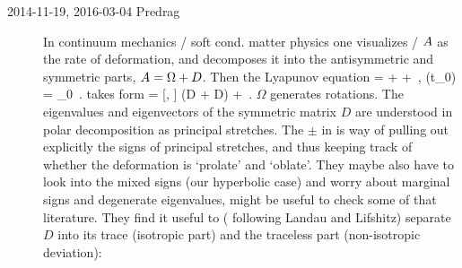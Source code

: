 \begin{description}
\item[2014-11-19, 2016-03-04 Predrag]
In continuum mechanics / soft cond. matter physics
one visualizes {\stabmat} / {\velgradmat} $A$
as the rate of deformation, and decomposes it into the antisymmetric
and symmetric parts, $A = \Omega + D$. Then the Lyapunov equation
\beq
\dot{\covMat} = \Mvar \covMat + \covMat \transp{\Mvar} + \diffTen
    \,,\qquad
\covMat(t_0) = \covMat_0
\,.
takes form
\beq
\dot{\covMat} = [\Omega, \covMat]
                \pm (D \covMat + \covMat D)
                 + \diffTen
\,.
$\Omega$ generates rotations. The eigenvalues and eigenvectors of
the symmetric matrix $D$ are understood in
 {polar
decomposition} as principal stretches. The $\pm$ in 
is way of pulling out explicitly the signs of principal stretches, and
thus keeping track of whether the deformation is `prolate' and `oblate'.
They maybe also have to look into the mixed signs (our hyperbolic case)
and worry about marginal signs and degenerate eigenvalues, might be
useful to check some of that literature.
They find it useful to
(
{following} Landau and Lifshitz)
separate $D$ into its trace (isotropic part) and the traceless part
(non-isotropic deviation):


\end{description}
